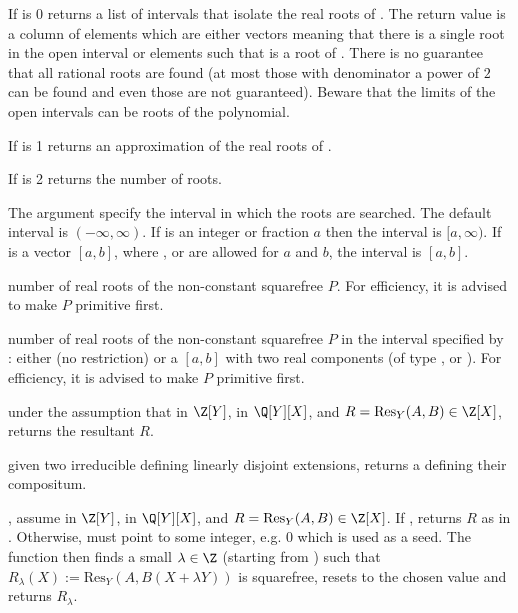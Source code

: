\item If  is 0 returns a list of intervals that isolate the real
roots of . The return value is a column of elements which are either
vectors \kbd{[a,b]} meaning that there is a single root in the open interval
 or elements  such that  is a root of .
There is no guarantee that all rational roots are found (at most those with
denominator a power of $2$ can be found and even those are not guaranteed).
Beware that the limits of the open intervals can be roots of the polynomial.

\item If  is 1 returns an approximation of the real roots of .

\item If  is 2 returns the number of roots.

The argument  specify the interval in which the roots
are searched. The default interval is $(-\infty,\infty)$. If  is an
integer or fraction $a$ then the interval is $[a,\infty)$. If  is
a vector $[a,b]$, where ,  or  are allowed
for $a$ and $b$, the interval is $[a,b]$.

 number of real roots of the non-constant
squarefree  $P$. For efficiency, it is advised to make $P$ primitive
first.

 number of real roots of the
non-constant squarefree  $P$ in the interval specified by :
either  (no restriction) or a  $[a,b]$ with two real
components (of type ,  or ). For efficiency,
it is advised to make $P$ primitive first.


under the assumption that  in $\Z[Y]$,  in $\Q[Y][X]$, and
$R = \text{Res}_Y(A, B) \in \Z[X]$, returns the resultant $R$.

 given two irreducible 
defining linearly disjoint extensions, returns a  defining their
compositum.

,
assume  in $\Z[Y]$,  in $\Q[Y][X]$, and $R =
\text{Res}_Y(A, B) \in \Z[X]$. If , returns $R$
as in . Otherwise,  must point to
some integer, e.g. $0$ which is used as a seed. The function then finds a
small $\lambda \in \Z$ (starting from ) such that
$R_\lambda(X) := \text{Res}_Y(A, B(X + \lambda Y))$ is squarefree, resets
 to the chosen value and returns $R_{\lambda}$.

